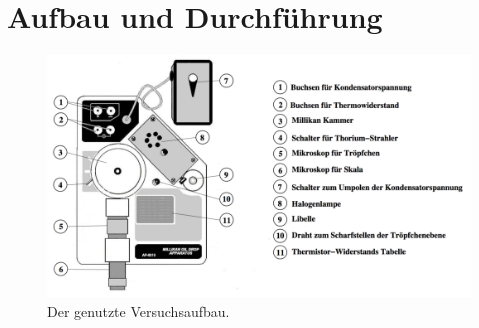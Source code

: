  \section{Aufbau und Durchführung}
\label{sec:Durchführung}

\begin{figure}
  \centering
  \includegraphics[width = \textwidth]{PicturePerfect/aufbau.pdf}
  \caption{Der genutzte Versuchsaufbau.\cite{anleitung}}
  \label{fig:aufbau}
\end{figure}

